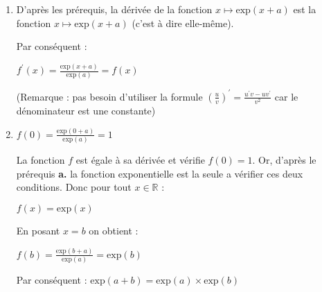 \begin{corrige}
     \begin{enumerate}
          \item
          D'après les prérequis, la dérivée de la fonction $x\mapsto \text{exp}\left(x+a\right)$ est la fonction $x\mapsto \text{exp}\left(x+a\right)$ (c'est à dire elle-même).
          \par
          Par conséquent :
          \par
          $f^{\prime}\left(x\right)=\frac{\text{exp}\left(x+a\right)}{\text{exp}\left(a\right)}=f\left(x\right)$
          \par
          (Remarque : pas besoin d'utiliser la formule $\left(\frac{u}{v}\right)^{\prime}=\frac{u^{\prime}v-uv^{\prime}}{v^{2}}$ car le dénominateur est une constante)
          \item
          $f\left(0\right)=\frac{\text{exp}\left(0+a\right)}{\text{exp}\left(a\right)}=1$
          \par
          La fonction $f$ est égale à sa dérivée et vérifie $f\left(0\right)=1$. Or, d'après le prérequis \textbf{a.} la fonction exponentielle est la seule a vérifier ces deux conditions. Donc pour tout $x \in  \mathbb{R}$ :
          \par
          $f\left(x\right)=\text{exp}\left(x\right)$
          \par
          En posant $x=b$ on obtient :
          \par
          $f\left(b\right)=\frac{\text{exp}\left(b+a\right)}{\text{exp}\left(a\right)}=\text{exp}\left(b\right)$
          \par
          Par conséquent : $\text{exp}\left(a+b\right)=\text{exp}\left(a\right)\times \text{exp}\left(b\right)$
 

\end{enumerate}
\end{corrige}
